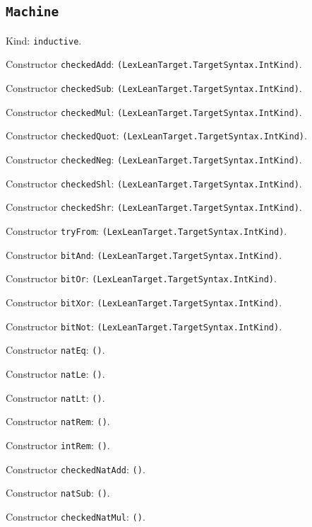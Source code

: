 \documentclass[11pt]{article}
\begin{document}
\subsection*{\texttt{Machine}}
\noindent Kind: \texttt{inductive}.\par
\noindent Constructor \texttt{checkedAdd}: \texttt{(LexLeanTarget.TargetSyntax.IntKind)}.\par
\noindent Constructor \texttt{checkedSub}: \texttt{(LexLeanTarget.TargetSyntax.IntKind)}.\par
\noindent Constructor \texttt{checkedMul}: \texttt{(LexLeanTarget.TargetSyntax.IntKind)}.\par
\noindent Constructor \texttt{checkedQuot}: \texttt{(LexLeanTarget.TargetSyntax.IntKind)}.\par
\noindent Constructor \texttt{checkedNeg}: \texttt{(LexLeanTarget.TargetSyntax.IntKind)}.\par
\noindent Constructor \texttt{checkedShl}: \texttt{(LexLeanTarget.TargetSyntax.IntKind)}.\par
\noindent Constructor \texttt{checkedShr}: \texttt{(LexLeanTarget.TargetSyntax.IntKind)}.\par
\noindent Constructor \texttt{tryFrom}: \texttt{(LexLeanTarget.TargetSyntax.IntKind)}.\par
\noindent Constructor \texttt{bitAnd}: \texttt{(LexLeanTarget.TargetSyntax.IntKind)}.\par
\noindent Constructor \texttt{bitOr}: \texttt{(LexLeanTarget.TargetSyntax.IntKind)}.\par
\noindent Constructor \texttt{bitXor}: \texttt{(LexLeanTarget.TargetSyntax.IntKind)}.\par
\noindent Constructor \texttt{bitNot}: \texttt{(LexLeanTarget.TargetSyntax.IntKind)}.\par
\noindent Constructor \texttt{natEq}: \texttt{()}.\par
\noindent Constructor \texttt{natLe}: \texttt{()}.\par
\noindent Constructor \texttt{natLt}: \texttt{()}.\par
\noindent Constructor \texttt{natRem}: \texttt{()}.\par
\noindent Constructor \texttt{intRem}: \texttt{()}.\par
\noindent Constructor \texttt{checkedNatAdd}: \texttt{()}.\par
\noindent Constructor \texttt{natSub}: \texttt{()}.\par
\noindent Constructor \texttt{checkedNatMul}: \texttt{()}.\par
\end{document}
